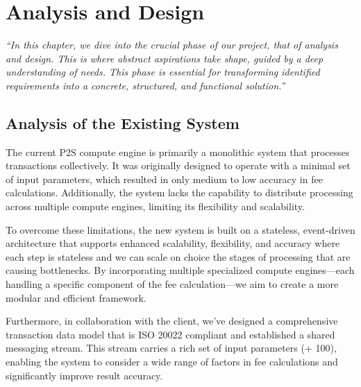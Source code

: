 \chapter{Analysis and Design}
\label{chap:conception}
\textit{``In this chapter, we dive into the crucial phase of our project, that of analysis and design. This is where abstract aspirations take shape, guided by a deep understanding of needs. This phase is essential for transforming identified requirements into a concrete, structured, and functional solution.''}
\pagebreak


\section{Analysis of the Existing System}

The current P2S compute engine is primarily a monolithic system that processes transactions collectively. It was originally designed to operate with a minimal set of input parameters, which resulted in only medium to low accuracy in fee calculations. Additionally, the system lacks the capability to distribute processing across multiple compute engines, limiting its flexibility and scalability.

To overcome these limitations, the new system is built on a stateless, event-driven architecture that supports enhanced scalability, flexibility, and accuracy where each step is stateless and we can scale on choice the stages of processing that are causing bottlenecks.
 By incorporating multiple specialized compute engines—each handling a specific component of the fee calculation—we aim to create a more modular and efficient framework.

Furthermore, in collaboration with the client, we’ve designed a comprehensive transaction data model that is ISO 20022 compliant and established a shared messaging stream.
 This stream carries a rich set of input parameters (+ 100), enabling the system to consider a wide range of factors in fee calculations and significantly improve result accuracy.


